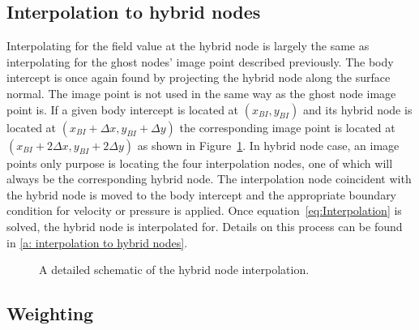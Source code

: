 \documentclass[onehalf,11pt]{beavtex}
\begin{document}
\subsection{Interpolation to hybrid nodes}
\label{Sec:Interpolation}

Interpolating for the field value at the hybrid node is largely the same as interpolating for the ghost nodes' image point described previously. 
The body intercept is once again found by projecting the hybrid node along the surface normal. 
The image point is not used in the same way as the ghost node image point is. 
If a given body intercept is located at $(x_{BI},y_{BI})$ and its hybrid node is located at $(x_{BI}+\Delta x,y_{BI}+\Delta y)$ the corresponding image point is located at $(x_{BI}+2\Delta x,y_{BI}+2\Delta y)$ as shown in Figure~\ref{fig:Interpolate}. 
In hybrid node case, an image points only purpose is locating the four interpolation nodes, one of which will always be the corresponding hybrid node. 
The interpolation node coincident with the hybrid node is moved to the body intercept and the appropriate boundary condition for velocity or pressure is applied.
Once equation~\eqref{eq:Interpolation} is solved, the hybrid node is interpolated for.
Details on this process can be found in \ref{a: interpolation to hybrid nodes}. 
\begin{figure}[!htb]
	\centering
	
	\caption{A detailed schematic of the hybrid node interpolation.}
	\label{fig:Interpolate}
\end{figure}

\subsection{Weighting}
\label{Sec:Weighting}
\end{document}
